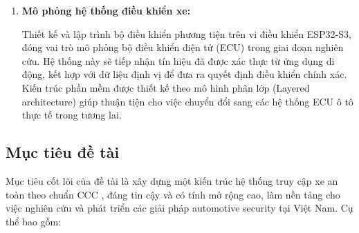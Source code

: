 \begin{enumerate}
    \item \textbf{Mô phỏng hệ thống điều khiển xe:}
    
    Thiết kế và lập trình bộ điều khiển phương tiện trên vi điều khiển ESP32-S3, đóng vai trò mô phỏng bộ điều khiển điện tử (ECU) trong giai đoạn nghiên cứu. Hệ thống này sẽ tiếp nhận tín hiệu đã được xác thực từ ứng dụng di động, kết hợp với dữ liệu định vị để đưa ra quyết định điều khiển chính xác. Kiến trúc phần mềm được thiết kế theo mô hình phân lớp (Layered architecture) giúp thuận tiện cho việc chuyển đổi sang các hệ thống ECU ô tô thực tế trong tương lai.
\end{enumerate}

\subsection{Mục tiêu đề tài}

Mục tiêu cốt lõi của đề tài là xây dựng một kiến trúc hệ thống truy cập xe an toàn theo chuẩn CCC \cite{ccc_digikey3}, đáng tin cậy và có tính mở rộng cao, làm nền tảng cho việc nghiên cứu và phát triển các giải pháp automotive security tại Việt Nam. Cụ thể bao gồm:

